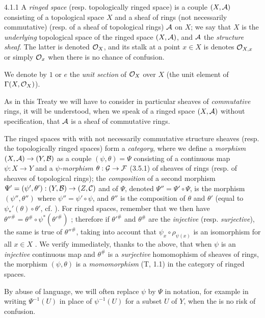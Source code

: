 \documentclass[../main.tex]{subfiles}
\begin{document}
\begin{env}{4.1.1}
A \emph{ringed space} (resp. topologically ringed space) is a couple $(X,\mathcal{A})$
consisting of a topological space $X$ and a sheaf of rings (not necessarily commutative)
(resp. of a sheaf of topological rings) $\mathcal{A}$ on $X$; we say that $X$ is the
\emph{underlying} topological space of the ringed space $(X,\mathcal{A})$, and $\mathcal{A}$
the \emph{structure sheaf}. The latter is denoted $\mathcal{O}_X$, and its stalk at a point
$x\in X$ is denotes $\mathcal{O}_{X,x}$ or simply $\mathcal{O}_x$ when there is no chance of confusion.

We denote by $1$ or $e$ the \emph{unit section} of $\mathcal{O}_X$ over $X$ (the unit element
of $\Gamma(X,\mathcal{O}_X)$).

As in this Treaty we will have to consider in particular sheaves of \emph{commutative}
rings, it will be understood, when we speak of a ringed space $(X,\mathcal{A})$ without
specification, that $\mathcal{A}$ is a sheaf of commutative rings.

The ringed spaces with with not necessarily commutative structure sheaves
(resp. the topologically ringed spaces) form a \emph{category}, where we define
a \emph{morphism} $(X,\mathcal{A})\to(Y,\mathcal{B})$ as a couple $(\psi,\theta)=\Psi$
consisting of a continuous map $\psi:X\to Y$ and a \emph{$\psi$-morphism}
$\theta:\mathcal{G}\to\mathcal{F}$ (3.5.1) of sheaves of rings (resp. of sheaves of
topological rings); the \emph{composition} of a second morphism
$\Psi'=(\psi',\theta'):(Y,\mathcal{B})\to(Z,\mathcal{C})$ and of $\Psi$, denoted
$\Psi''=\Psi'\circ\Psi$, is the morphism $(\psi'',\theta'')$ where $\psi''=\psi'\circ\psi$,
and $\theta''$ is the composition of $\theta$ and $\theta'$ (equal to
$\psi_\ast'(\theta)\circ\theta'$, cf. ). For ringed spaces, remember that we
then have ${\theta''}^\#=\theta^\#\circ\psi^\ast({\theta'}^\#)$ ; therefore
if ${\theta'}^\#$ and $\theta^\#$ are the \emph{injective} (resp. \emph{surjective}),
the same is true of ${\theta''}^\#$, taking into account that $\psi_x\circ\rho_{\psi(x)}$
is an isomorphism for all $x\in X$ . We verify immediately, thanks to the
above, that when $\psi$ is an \emph{injective} continuous map and $\theta^\#$ is
a \emph{surjective} homomophism of sheaves of rings, the morphism $(\psi,\theta)$ is
a \emph{momomorphism} (T, 1.1) in the category of ringed spaces.

By abuse of language, we will often replace $\psi$ by $\Psi$ in notation, for
example in writing $\Psi^{-1}(U)$ in place of $\psi^{-1}(U)$ for a subset $U$ of $Y$,
when the is no risk of confusion.
\end{env}

\end{document}
